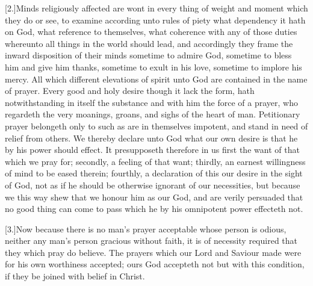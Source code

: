 [2.]Minds religiously affected are wont in every thing of weight and moment which they do or see, to examine according unto rules of piety what dependency it hath on God, what reference to themselves, what coherence with any of those duties whereunto all things in the world should lead, and accordingly they frame the inward disposition of their minds sometime to admire God, sometime to bless him and give him thanks, sometime to exult in his love, sometime to implore his mercy. All which different elevations of spirit unto God are contained in the name of prayer. Every good and holy desire though it lack the form, hath notwithstanding in itself the substance and with him the force of a prayer, who regardeth the very moanings, groans, and sighs of the heart of man. Petitionary prayer belongeth only to such as are in themselves impotent, and stand in need of relief from others. We thereby declare unto God what our own desire is that he by his power should effect. It presupposeth therefore in us first the want of that which we pray for; secondly, a feeling of that want; thirdly, an earnest willingness of mind to be eased therein; fourthly, a declaration of this our desire in the sight of God, not as if he should be otherwise ignorant of our necessities, but because we this way shew that we honour him as our God, and are verily persuaded that no good thing can come to pass which he by his omnipotent power effecteth not.

[3.]Now because there is no man’s prayer acceptable whose person is odious, neither any man’s person gracious without faith, it is of necessity required that they which pray do believe. The prayers which our Lord and Saviour made were for his own worthiness accepted; ours God accepteth not but with this condition, if they be joined with belief in Christ.

